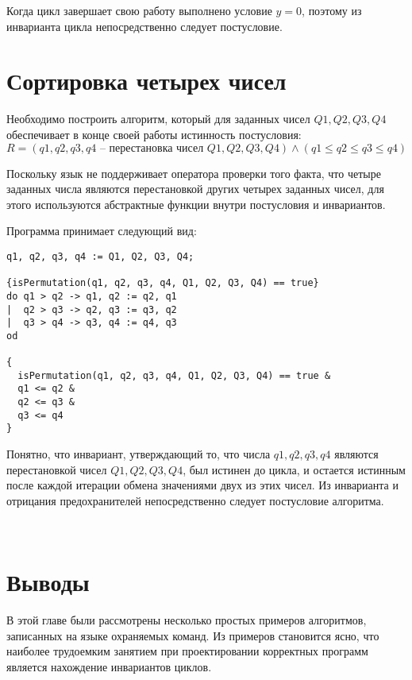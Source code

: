 Когда цикл завершает свою работу выполнено условие $y = 0$, поэтому из инварианта цикла непосредственно следует постусловие.

\section{Сортировка четырех чисел}
Необходимо построить алгоритм, который для заданных чисел $Q1, Q2, Q3, Q4$ обеспечивает
в конце своей работы истинность постусловия:
\begin{equation}
    R = (q1, q2, q3, q4 \text{ -- перестановка чисел } Q1, Q2, Q3, Q4) \wedge (q1 \leq q2 \leq q3 \leq q4)
\end{equation}

Поскольку язык не поддерживает оператора проверки того факта, что четыре заданных числа являются
перестановкой других четырех заданных чисел, для этого используются абстрактные функции внутри постусловия
и инвариантов.

Программа принимает следующий вид:
\begin{verbatim}
q1, q2, q3, q4 := Q1, Q2, Q3, Q4;

{isPermutation(q1, q2, q3, q4, Q1, Q2, Q3, Q4) == true}
do q1 > q2 -> q1, q2 := q2, q1
|  q2 > q3 -> q2, q3 := q3, q2
|  q3 > q4 -> q3, q4 := q4, q3
od

{
  isPermutation(q1, q2, q3, q4, Q1, Q2, Q3, Q4) == true &
  q1 <= q2 &
  q2 <= q3 &
  q3 <= q4
}
\end{verbatim} 

Понятно, что инвариант, утверждающий то, что числа $q1, q2, q3, q4$ являются перестановкой чисел $Q1, Q2, Q3, Q4$,
был истинен до цикла, и остается истинным после каждой итерации обмена значениями двух из этих чисел. Из инварианта и
отрицания предохранителей непосредственно следует постусловие алгоритма.

\

\section{Выводы} \label{ch4:conclusion}
В этой главе были рассмотрены несколько простых примеров алгоритмов, записанных на
языке охраняемых команд. Из примеров становится ясно, что наиболее
трудоемким занятием при проектировании корректных программ является нахождение 
инвариантов циклов.

%
